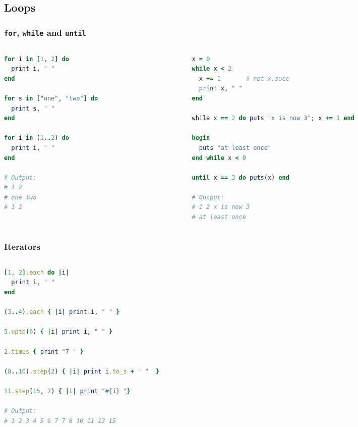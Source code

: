\subsection{Loops}
\begin{frame}[fragile]\frametitle{\texttt{for}, \texttt{while} and \texttt{until}}

\begin{columns}[c] 

\begin{column}{5.3cm}
\begin{lstlisting}[language=ruby]
for i in [1, 2] do
  print i, " "
end

for s in ["one", "two"] do
  print s, " "
end

for i in (1..2) do
  print i, " "
end

# Output: 
# 1 2
# one two
# 1 2
\end{lstlisting}
\end{column}
\pause
\begin{column}{5.4cm}
\begin{lstlisting}[language=ruby]
x = 0
while x < 2
  x += 1       # not x.succ
  print x, " "
end

while x == 2 do puts "x is now 3"; x += 1 end

begin
  puts "at least once"
end while x < 0

until x == 3 do puts(x) end

# Output:
# 1 2 x is now 3
# at least once
\end{lstlisting}
\end{column}

\end{columns}

\end{frame}




\begin{frame}[fragile]\frametitle{Iterators}

\begin{columns}[c] 

\begin{column}{8.5cm}
\begin{lstlisting}[language=ruby]
[1, 2].each do |i| 
  print i, " " 
end

(3..4).each { |i| print i, " " }

5.upto(6) { |i| print i, " " }

2.times { print "7 " }

(8..10).step(2) { |i| print i.to_s + " "  }

11.step(15, 2) { |i| print "#{i} "}

# Output: 
# 1 2 3 4 5 6 7 7 8 10 11 13 15
\end{lstlisting}
\end{column}


\end{columns}

\end{frame}




